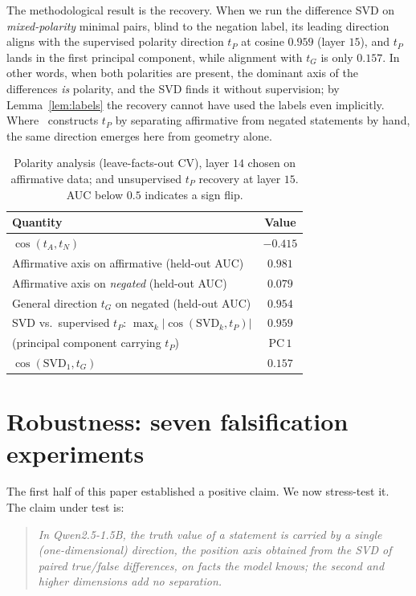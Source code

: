 \documentclass[11pt]{article}
\begin{document}
The methodological result is the recovery. When we run the difference SVD on
\emph{mixed-polarity} minimal pairs, blind to the negation label, its leading
direction aligns with the supervised polarity direction $t_P$ at cosine
$0.959$ (layer $15$), and $t_P$ lands in the first principal component, while
alignment with $t_G$ is only $0.157$. In other words, when both polarities
are present, the dominant axis of the differences \emph{is} polarity, and the
SVD finds it without supervision; by Lemma~\ref{lem:labels} the recovery
cannot have used the labels even implicitly. Where~\cite{burger2024}
constructs $t_P$ by separating affirmative from negated statements by hand,
the same direction emerges here from geometry alone.

\begin{table}[t]
\centering
\caption{Polarity analysis (leave-facts-out CV), layer $14$ chosen on
affirmative data; and unsupervised $t_P$ recovery at layer $15$. AUC below
$0.5$ indicates a sign flip.}
\label{tab:polarity}
\begin{tabular}{lc}
\toprule
Quantity & Value \\
\midrule
$\cos(t_A, t_N)$ & $-0.415$ \\
Affirmative axis on affirmative (held-out AUC) & $0.981$ \\
Affirmative axis on \emph{negated} (held-out AUC) & $0.079$ \\
General direction $t_G$ on negated (held-out AUC) & $0.954$ \\
\midrule
SVD vs.\ supervised $t_P$: $\max_k |\cos(\mathrm{SVD}_k, t_P)|$ & $0.959$ \\
\quad (principal component carrying $t_P$) & PC\,$1$ \\
$\cos(\mathrm{SVD}_1, t_G)$ & $0.157$ \\
\bottomrule
\end{tabular}
\end{table}


\section{Robustness: seven falsification experiments}
\label{sec:robust}

The first half of this paper established a positive claim. We now stress-test
it. The claim under test is:

\begin{quote}
\emph{In Qwen2.5-1.5B, the truth value of a statement is carried by a single
(one-dimensional) direction, the position axis obtained from the SVD of
paired true/false differences, on facts the model knows; the second and
higher dimensions add no separation.}
\end{quote}
\end{document}
